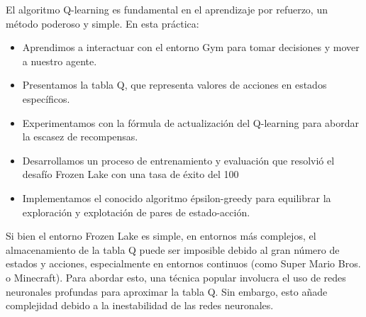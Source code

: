 \documentclass{article}
\begin{document}
\vspace{1cm}

El algoritmo Q-learning es fundamental en el aprendizaje por refuerzo, un método poderoso y simple. En esta práctica:

\vspace{0.5cm}

\begin{itemize}
    \item Aprendimos a interactuar con el entorno Gym para tomar decisiones y mover a nuestro agente.
    \item Presentamos la tabla Q, que representa valores de acciones en estados específicos.
    \item Experimentamos con la fórmula de actualización del Q-learning para abordar la escasez de recompensas.
    \item Desarrollamos un proceso de entrenamiento y evaluación que resolvió el desafío Frozen Lake con una tasa de éxito del 100%
    \item Implementamos el conocido algoritmo épsilon-greedy para equilibrar la exploración y explotación de pares de estado-acción.
\end{itemize}

\vspace{0.5cm}

Si bien el entorno Frozen Lake es simple, en entornos más complejos, el almacenamiento de la tabla Q puede ser imposible debido al gran número de estados y acciones, especialmente en entornos continuos (como Super Mario Bros. o Minecraft). Para abordar esto, una técnica popular involucra el uso de redes neuronales profundas para aproximar la tabla Q. Sin embargo, esto añade complejidad debido a la inestabilidad de las redes neuronales.
\end{document}

